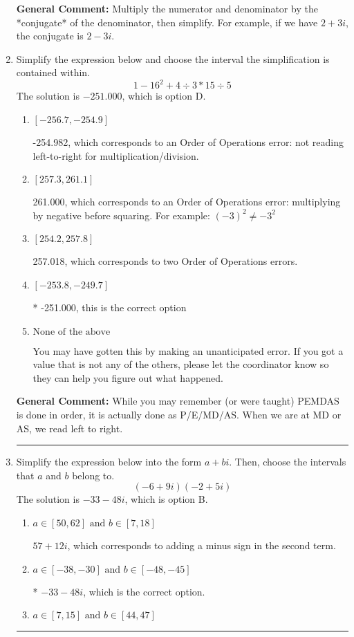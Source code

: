 \documentclass{extbook}[14pt]
\newcommand{\litem}[1]{\item #1

\rule{\textwidth}{0.4pt}}
\begin{document}
\begin{enumerate}
{\textbf{General Comment:} Multiply the numerator and denominator by the *conjugate* of the denominator, then simplify. For example, if we have $2+3i$, the conjugate is $2-3i$.
}
\litem{
Simplify the expression below and choose the interval the simplification is contained within.
\[ 1 - 16^2 + 4 \div 3 * 15 \div 5 \]The solution is \( -251.000 \), which is option D.\begin{enumerate}[label=\Alph*.]
\item \( [-256.7, -254.9] \)

 -254.982, which corresponds to an Order of Operations error: not reading left-to-right for multiplication/division.
\item \( [257.3, 261.1] \)

 261.000, which corresponds to an Order of Operations error: multiplying by negative before squaring. For example: $(-3)^2 \neq -3^2$
\item \( [254.2, 257.8] \)

 257.018, which corresponds to two Order of Operations errors.
\item \( [-253.8, -249.7] \)

* -251.000, this is the correct option
\item \( \text{None of the above} \)

 You may have gotten this by making an unanticipated error. If you got a value that is not any of the others, please let the coordinator know so they can help you figure out what happened.
\end{enumerate}

\textbf{General Comment:} While you may remember (or were taught) PEMDAS is done in order, it is actually done as P/E/MD/AS. When we are at MD or AS, we read left to right.
}
\litem{
Simplify the expression below into the form $a+bi$. Then, choose the intervals that $a$ and $b$ belong to.
\[ (-6 + 9 i)(-2 + 5 i) \]The solution is \( -33 - 48 i \), which is option B.\begin{enumerate}[label=\Alph*.]
\item \( a \in [50, 62] \text{ and } b \in [7, 18] \)

 $57 + 12 i$, which corresponds to adding a minus sign in the second term.
\item \( a \in [-38, -30] \text{ and } b \in [-48, -45] \)

* $-33 - 48 i$, which is the correct option.
\item \( a \in [7, 15] \text{ and } b \in [44, 47] \)


\end{enumerate}}
\end{enumerate}
\end{document}
